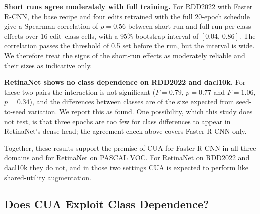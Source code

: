 \noindent\textbf{Short runs agree moderately with full training.} For RDD2022 with Faster R-CNN, the base recipe and four edits retrained with the full 20-epoch schedule give a Spearman correlation of $\rho=0.56$ between short-run and full-run per-class effects over 16 edit--class cells, with a 95\% bootstrap interval of $[0.04,\,0.86]$. The correlation passes the threshold of 0.5 set before the run, but the interval is wide. We therefore treat the signs of the short-run effects as moderately reliable and their sizes as indicative only.

\noindent\textbf{RetinaNet shows no class dependence on RDD2022 and dacl10k.} For these two pairs the interaction is not significant ($F=0.79$, $p=0.77$ and $F=1.06$, $p=0.34$), and the differences between classes are of the size expected from seed-to-seed variation. We report this as found. One possibility, which this study does not test, is that three epochs are too few for class differences to appear in RetinaNet's dense head; the agreement check above covers Faster R-CNN only.

Together, these results support the premise of CUA for Faster R-CNN in all three domains and for RetinaNet on PASCAL VOC. For RetinaNet on RDD2022 and dacl10k they do not, and in those two settings CUA is expected to perform like shared-utility augmentation.

\subsection{Does CUA Exploit Class Dependence?}
\label{sec:results_comparison}


\begin{table}[t]
\caption{Test Macro AP50 of the Compared Policies (Mean $\pm$ s.d.\ over Three Seeds)}
\label{tab:main}
\centering
\footnotesize
{}
\end{table}

\begin{figure}[t]
\centering
{}
\caption{}
\label{fig:forest}
\end{figure}

